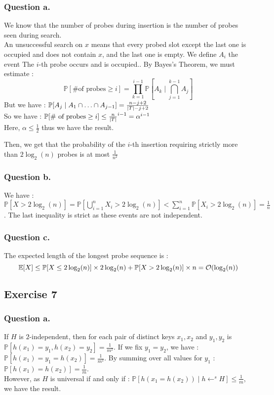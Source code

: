 \documentclass{cours}
\begin{document}
\subsubsection{Question a.}
We know that the number of probes during insertion is the number of probes seen during search.\\
An unsuccessful search on $x$ means that every probed slot except the last one is occupied and does not contain $x$, and the last one is empty. 
We define $A_{i}$ the event \og The $i$-th probe occurs and is occupied.\fg. By Bayes's Theorem, we must estimate : 
\[
    \mathbb{P}[\text{\# of probes} \geq i] = \prod_{k = 1}^{i - 1} \mathbb{P}[A_{k} \mid \bigcap\limits_{j = 1}^{k - 1} A_{j}]
\]
But we have : $\mathbb{P}[A_{j}\mid A_{1} \cap \ldots \cap A_{j - 1}] = \frac{n - j + 2}{\left|T\right| - j + 2}$\\
So we have : $\mathbb{P}[\text{\# of probes} \geq i] \leq \frac{n}{\left|T\right|}^{i - 1} = \alpha^{i - 1}$\\
Here, $\alpha \leq \frac{1}{2}$ thus we have the result. 

Then, we get that the probability of the $i$-th insertion requiring strictly more than $2\log_{2}(n)$ probes is at most $\frac{1}{n^{2}}$


\subsubsection{Question b.}
We have : $\mathbb{P}[X > 2\log_{2}(n)] = \mathbb{P}\left[\bigcup_{i=1}^{n}{X_{i} > 2 \log_{2}(n)}\right] < \sum_{i = 1}^{n}\mathbb{P}\left[X_{i} > 2\log_{2}(n)\right] = \frac{1}{n}$. 
The last inequality is strict as these events are not independent. 

\subsubsection{Question c.}
The expected length of the longest probe sequence is :
\[
        \mathbb{E}[X] \leq \mathbb{P}[X \leq 2\log_{2}(n)]\times 2\log_{2}(n) + \mathbb{P}[X > 2\log_{2}(n)]\times n = \mathcal{O}(\log_{2}(n))
\]

\subsection{Exercise 7}
\subsubsection{Question a.}
If $H$ is $2$-independent, then for each pair of distinct keys $x_{1}, x_{2}$ and $y_{1}, y_{2}$ is $\mathbb{P}[h(x_{1}) = y_{1}, h(x_{2}) = y_{2}] = \frac{1}{m^{2}}$. 
If we fix $y_{1} = y_{2}$, we have : $\mathbb{P}[h(x_{1}) =y_{1}= h(x_{2})] = \frac{1}{m^{2}}$. By summing over all values for $y_{1}$ :
$\mathbb{P}[h(x_{1}) = h(x_{2})] = \frac{1}{m}$.\\
However, as $H$ is universal if and only if : $\mathbb{P}[h(x_{1} = h(x_{2}))\mid h \gets^{s} H] \leq \frac{1}{m}$, we have the result. 
\end{document}
